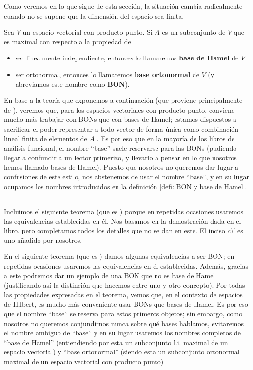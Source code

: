 Como veremos en lo que sigue de esta sección,
la situación cambia radicalmente cuando no se supone
que la dimensión del espacio sea finita.

\begin{defi} \label{defi: BON y base de Hamel}
Sea $V$ un espacio vectorial con producto punto.
Si $A$ es un subconjunto de $V$ que es 
maximal con respecto a la propiedad de
\begin{itemize}
\item ser linealmente independiente, entonces lo llamaremos
\textbf{base de Hamel} de $V$
\item ser ortonormal, entonces lo llamaremos
\textbf{base ortonormal} de $V$ (y abreviamos este
nombre como \textbf{BON}).
\end{itemize}
\end{defi}

En base a la teoría que exponemos a continuación
(que proviene principalmente de ),
veremos que, para los espacios vectoriales con producto
punto, conviene mucho más trabajar con BONs que con
bases de Hamel; estamos dispuestos a sacrificar el poder
representar a todo vector de forma única como combinación lineal
finita de elementos de $A$ . Es por eso que en la mayoría
de los libros de análisis funcional, el nombre ``base''
suele reservarse para las BONs (pudiendo llegar a confundir
a un lector primerizo, y llevarlo a pensar en
lo que nosotros hemos llamado bases de Hamel). Puesto que
nosotros no queremos dar lugar a confusiones de este estilo,
nos abstenemos de usar el nombre ``base'', y en su lugar ocupamos
los nombres introducidos en la definición \ref{defi: BON y base de Hamel}.

\[
----
\]

Incluimos el siguiente teorema (que es 
) porque en repetidas ocasiones
usaremos las equivalencias establecidas en él. Nos basamos
en la demostración dada en el libro, pero completamos todos
los detalles que no se dan en este. El inciso $c)'$
es uno añadido por nosotros.


En el siguiente teorema (que es 
) damos algunas equivalencias
a ser BON; en repetidas ocasiones usaremos las equivalencias
en él establecidas. Además, gracias a este podremos
dar un ejemplo de una BON que no es base de Hamel (justificando
así la distinción que hacemos entre uno y otro concepto).
Por todas las propiedades expresadas en el teorema, vemos
que, en el contexto de espacios de Hilbert, es 
mucho más conveniente usar BONs que bases de Hamel.
Es por eso que el nombre ``base'' se reserva para
estos primeros objetos; sin embargo, como
nosotros no queremos conjundirnos nunca sobre qué bases
hablamos, evitaremos el nombre ambiguo de ``base'' y en su lugar
usaremos los nombres completos de ``base de Hamel''
(entiendiendo por esta un subconjunto l.i. maximal
de un espacio vectorial) y ``base ortonormal''
(siendo esta un subconjunto ortonormal maximal
de un espacio vectorial con producto punto)

